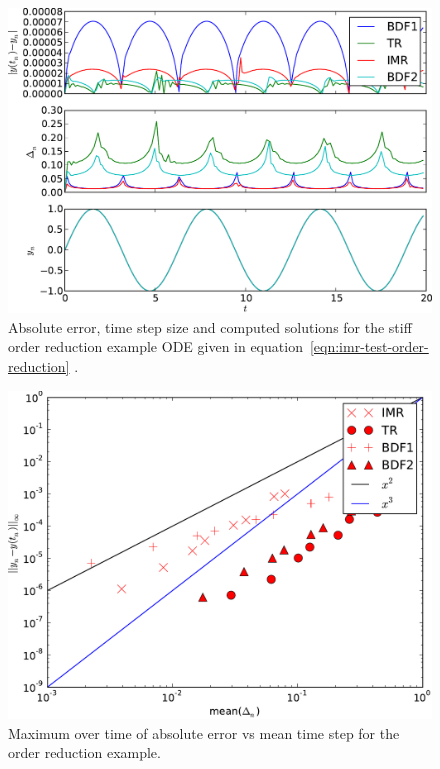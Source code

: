 \begin{figure}
  \centering  \includegraphics[width=1\textwidth]{plots/aimr_odes/strong_order_reduction-errornormsvs-dtsvs-tracevaluesvstimes}
  \caption{Absolute error, time step size and computed solutions for the stiff order reduction example ODE given in equation~\eqref{eqn:imr-test-order-reduction}
    .}
  \label{fig:imr-order-reduction-example}
\end{figure}

\begin{figure}
  \centering  \includegraphics[width=1\textwidth]{plots/aimr_odes/order_reduction-maxoferrornormsvsmeanofdts.pdf}
  \caption{Maximum over time of absolute error vs mean time step for the order reduction example.}
  \label{fig:imr-order-reduction-convergence}
\end{figure}

